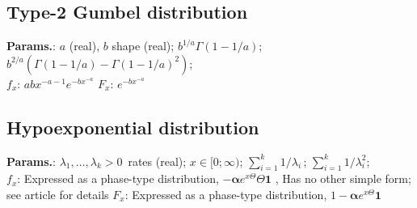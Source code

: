     
        
\subsection{Type-2 Gumbel distribution}





    {\color{darkblue} \textbf{Params.}:} {$a\!$ (real),  $b\!$ shape (real)}; {$ b^{1/a}\Gamma(1-1/a)\!$}; {$b^{2/a}(\Gamma(1-1/a)-{\Gamma(1-1/a)}^2)\!$};\hspace{0.5cm}\\{\color{darkblue} \textbf{$f_x$}:} {$ a b x^{-a-1} e^{-b x^{-a}}\!$}{\color{darkblue} \textbf{$F_x$}:} {$ e^{-b x^{-a}}\!$}



    
        
\subsection{Hypoexponential distribution}





    {\color{darkblue} \textbf{Params.}:} {$\lambda_{1},\dots,\lambda_{k} > 0\,$ rates (real)}; {$x \in [0; \infty)\!$}; {$\sum^{k}_{i=1}1/\lambda_{i}\,$}; {$\sum^{k}_{i=1}1/\lambda^2_{i}$};\hspace{0.5cm}\\{\color{darkblue} \textbf{$f_x$}:} {Expressed as a phase-type distribution,  $-\boldsymbol{\alpha}e^{x\Theta}\Theta\boldsymbol{1}$ , Has no other simple form; see article for details}{\color{darkblue} \textbf{$F_x$}:} {Expressed as a phase-type distribution,  $1-\boldsymbol{\alpha}e^{x\Theta}\boldsymbol{1}$}



